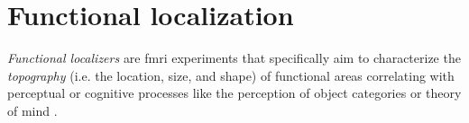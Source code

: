 \section{Functional localization}




\textit{Functional localizers} \citep[cf.][for reviews]{saxe2006divide,
friston2006critique} are \ac{fmri} experiments that specifically aim to
characterize the \textit{topography} (i.e. the location, size, and shape) of
functional areas correlating with perceptual or cognitive processes like the
perception of object categories \citep{kanwisher1997ffa} or theory of mind
\citep{spunt2014validating}.



